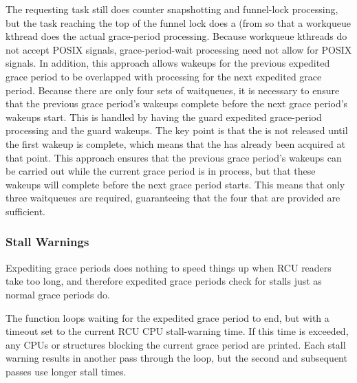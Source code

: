 The requesting task still does counter snapshotting and funnel-lock
processing, but the task reaching the top of the funnel lock does a
 (from  so that a
workqueue kthread does the actual grace-period processing.
Because
workqueue kthreads do not accept POSIX signals, grace-period-wait
processing need not allow for POSIX signals.
In addition, this approach
allows wakeups for the previous expedited grace period to be overlapped
with processing for the next expedited grace period.
Because there are
only four sets of waitqueues, it is necessary to ensure that the
previous grace period's wakeups complete before the next grace period's
wakeups start.
This is handled by having the  guard
expedited grace-period processing and the  guard
wakeups.
The key point is that the  is not released until
the first wakeup is complete, which means that the 
has already been acquired at that point.
This approach ensures that the
previous grace period's wakeups can be carried out while the current
grace period is in process, but that these wakeups will complete before
the next grace period starts.
This means that only three waitqueues are
required, guaranteeing that the four that are provided are sufficient.

\subsubsection{Stall Warnings}

Expediting grace periods does nothing to speed things up when RCU
readers take too long, and therefore expedited grace periods check for
stalls just as normal grace periods do.

\QuickQuizEnd

The  function loops waiting for
the expedited grace period to end, but with a timeout set to the current
RCU CPU stall-warning time.
If this time is exceeded, any CPUs or
 structures blocking the current grace period are printed.
Each stall warning results in another pass through the loop, but the
second and subsequent passes use longer stall times.

